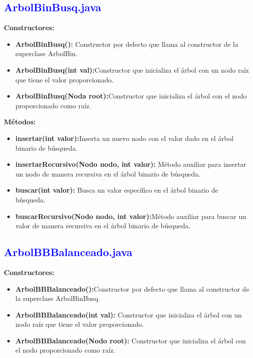 \documentclass[12pt]{article}
\begin{document}
\subsection{\textcolor{blue}{ArbolBinBusq.java}}

\textbf{Constructores:}
\begin{itemize}
    \item \textbf{ArbolBinBusq():} Constructor por defecto que llama al constructor de la superclase ArbolBin.
    
    \item \textbf{ArbolBinBusq(int val):}Constructor que inicializa el árbol con un nodo raíz que tiene el valor proporcionado.
    
     \item \textbf{ArbolBinBusq(Noda root):}Constructor que inicializa el árbol con el nodo proporcionado como raíz.
\end{itemize}

\textbf{Métodos:}
\begin{itemize}
    \item \textbf{insertar(int valor):}Inserta un nuevo nodo con el valor dado en el árbol binario de búsqueda.
    
    \item \textbf{insertarRecursivo(Nodo nodo, int valor): }Método auxiliar para insertar un nodo de manera recursiva en el árbol binario de búsqueda.

    \item \textbf{buscar(int valor): }Busca un valor específico en el árbol binario de búsqueda.

    \item \textbf{buscarRecursivo(Nodo nodo, int valor):}Método auxiliar para buscar un valor de manera recursiva en el árbol binario de búsqueda.
\end{itemize}

\subsection{\textcolor{blue}{ArbolBBBalanceado.java}}

\textbf{Constructores:}
\begin{itemize}
    \item \textbf{ArbolBBBalanceado():}Constructor por defecto que llama al constructor de la superclase ArbolBinBusq.
    
     \item \textbf{ArbolBBBalanceado(int val):} Constructor que inicializa el árbol con un nodo raíz que tiene el valor proporcionado.
     
     \item \textbf{ArbolBBBalanceado(Nodo root):} Constructor que inicializa el árbol con el nodo proporcionado como raíz.
\end{itemize}
\end{document}
